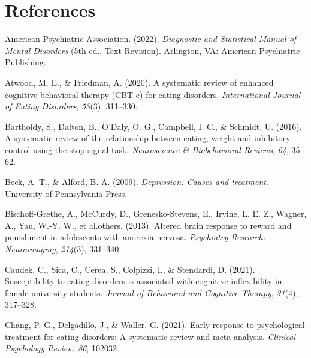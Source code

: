 \documentclass[
  man,floatsintext]{apa6}
\newlength{\cslhangindent}
\newlength{\cslentryspacingunit} %
\newenvironment{CSLReferences}[2] %
 {%
  \setlength{\parindent}{0pt}
  \ifodd #1
  \let\oldpar\par
  \def\par{\hangindent=\cslhangindent\oldpar}
  \fi
  \setlength{\parskip}{#2\cslentryspacingunit}
 }%
 {}
\begin{document}
\newpage

\hypertarget{references}{%
\section{References}\label{references}}

\hypertarget{refs}{}
\begin{CSLReferences}{1}{0}
\leavevmode{}%
American Psychiatric Association. (2022). \emph{{Diagnostic and Statistical Manual of Mental Disorders}} (5th ed., Text Revision). Arlington, VA: {American Psychiatric Publishing}.

\leavevmode{}%
Atwood, M. E., \& Friedman, A. (2020). A systematic review of enhanced cognitive behavioral therapy (CBT-e) for eating disorders. \emph{International Journal of Eating Disorders}, \emph{53}(3), 311--330.

\leavevmode{}%
Bartholdy, S., Dalton, B., O'Daly, O. G., Campbell, I. C., \& Schmidt, U. (2016). A systematic review of the relationship between eating, weight and inhibitory control using the stop signal task. \emph{Neuroscience \& Biobehavioral Reviews}, \emph{64}, 35--62.

\leavevmode{}%
Beck, A. T., \& Alford, B. A. (2009). \emph{Depression: Causes and treatment}. University of Pennsylvania Press.

\leavevmode{}%
Bischoff-Grethe, A., McCurdy, D., Grenesko-Stevens, E., Irvine, L. E. Z., Wagner, A., Yau, W.-Y. W., et al.others. (2013). Altered brain response to reward and punishment in adolescents with anorexia nervosa. \emph{Psychiatry Research: Neuroimaging}, \emph{214}(3), 331--340.

\leavevmode{}%
Caudek, C., Sica, C., Cerea, S., Colpizzi, I., \& Stendardi, D. (2021). Susceptibility to eating disorders is associated with cognitive inflexibility in female university students. \emph{Journal of Behavioral and Cognitive Therapy}, \emph{31}(4), 317--328.

\leavevmode{}%
Chang, P. G., Delgadillo, J., \& Waller, G. (2021). Early response to psychological treatment for eating disorders: A systematic review and meta-analysis. \emph{Clinical Psychology Review}, \emph{86}, 102032.


\end{CSLReferences}
\end{document}
